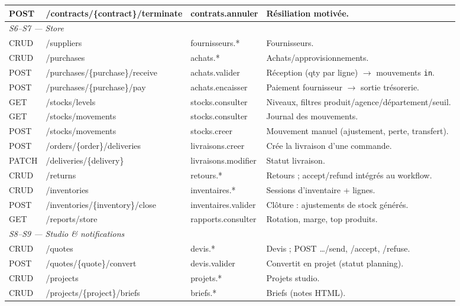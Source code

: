 \documentclass[11pt,a4paper]{article}
\begin{document}
\begin{longtable}{|p{1.3cm}|p{4.6cm}|p{2.7cm}|p{6.8cm}|}
POST & /contracts/\{contract\}/terminate & contrats.annuler & Résiliation motivée. \\ \hline
\multicolumn{4}{|l|}{\cellcolor{peklight}\textit{S6--S7 --- Store}} \\ \hline
CRUD & /suppliers & fournisseurs.* & Fournisseurs. \\ \hline
CRUD & /purchases & achats.* & Achats/approvisionnements. \\ \hline
POST & /purchases/\{purchase\}/receive & achats.valider & Réception (qty par ligne) $\rightarrow$ mouvements \texttt{in}. \\ \hline
POST & /purchases/\{purchase\}/pay & achats.encaisser & Paiement fournisseur $\rightarrow$ sortie trésorerie. \\ \hline
GET & /stocks/levels & stocks.consulter & Niveaux, filtres produit/agence/département/seuil. \\ \hline
GET & /stocks/movements & stocks.consulter & Journal des mouvements. \\ \hline
POST & /stocks/movements & stocks.creer & Mouvement manuel (ajustement, perte, transfert). \\ \hline
POST & /orders/\{order\}/deliveries & livraisons.creer & Crée la livraison d'une commande. \\ \hline
PATCH & /deliveries/\{delivery\} & livraisons.modifier & Statut livraison. \\ \hline
CRUD & /returns & retours.* & Retours ; accept/refund intégrés au workflow. \\ \hline
CRUD & /inventories & inventaires.* & Sessions d'inventaire + lignes. \\ \hline
POST & /inventories/\{inventory\}/close & inventaires.valider & Clôture : ajustements de stock générés. \\ \hline
GET & /reports/store & rapports.consulter & Rotation, marge, top produits. \\ \hline
\multicolumn{4}{|l|}{\cellcolor{peklight}\textit{S8--S9 --- Studio \& notifications}} \\ \hline
CRUD & /quotes & devis.* & Devis ; POST \ldots/send, /accept, /refuse. \\ \hline
POST & /quotes/\{quote\}/convert & devis.valider & Convertit en projet (statut planning). \\ \hline
CRUD & /projects & projets.* & Projets studio. \\ \hline
CRUD & /projects/\{project\}/briefs & briefs.* & Briefs (notes HTML). \\ \hline

\end{longtable}
\end{document}
